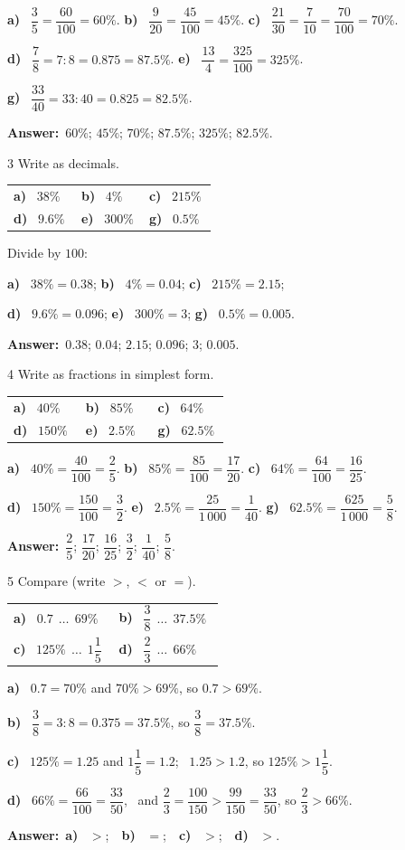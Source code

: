 \documentclass[11pt]{article}
\makeatletter
\newif\ifsol \solfalse
\renewcommand{\arraystretch}{1.35}
\providecommand{\AnsWord}{Đáp số}
\newcommand{\dapso}[1]{\par\textbf{\AnsWord:}\ #1}
\newcommand{\probsol}[1]{%
  \begin{lrbox}{\solmeasure}\begin{minipage}{\dimexpr\linewidth-24pt\relax}#1\end{minipage}\end{lrbox}%
  \ifsol
    \begin{solbox}#1\end{solbox}%
  \else
    \setlength{\solht}{\dimexpr\ht\solmeasure+\dp\solmeasure+0.85cm\relax}%
    \ifdim\solht<1.35cm\setlength{\solht}{1.35cm}\fi
    \begin{tcolorbox}[colback=white,colframe=Line,boxrule=0.8pt,arc=5pt,
      left=8pt,right=8pt,top=4pt,bottom=4pt,height=\solht]{\footnotesize\color{Slate}\itshape\WorkWord}\end{tcolorbox}%
  \fi}
\newcommand{\pa}[1]{\textbf{#1)}\ }
\newenvironment{cols2}{\par\vspace{3pt}\noindent\setlength{\tabcolsep}{0pt}\renewcommand{\arraystretch}{1.3}%
  \begin{tabular}{@{}>{\raggedright\arraybackslash\rule{0pt}{4.4ex}}p{0.48\linewidth}<{\rule[-2.3ex]{0pt}{0pt}}@{\hspace{0.03\linewidth}}>{\raggedright\arraybackslash\rule{0pt}{4.4ex}}p{0.48\linewidth}<{\rule[-2.3ex]{0pt}{0pt}}@{}}}%
  {\end{tabular}\par}
\newenvironment{cols3}{\par\vspace{3pt}\noindent\setlength{\tabcolsep}{0pt}\renewcommand{\arraystretch}{1.3}%
  \begin{tabular}{@{}>{\raggedright\arraybackslash\rule{0pt}{4.4ex}}p{0.32\linewidth}<{\rule[-2.3ex]{0pt}{0pt}}@{\hspace{0.015\linewidth}}>{\raggedright\arraybackslash\rule{0pt}{4.4ex}}p{0.32\linewidth}<{\rule[-2.3ex]{0pt}{0pt}}@{\hspace{0.015\linewidth}}>{\raggedright\arraybackslash\rule{0pt}{4.4ex}}p{0.32\linewidth}<{\rule[-2.3ex]{0pt}{0pt}}@{}}}%
  {\end{tabular}\par}
\newcommand{\gap}{\vspace{0.3cm}}
\def\WorkWord{Your work:}
\def\AnsWord{Answer}
\makeatother
\begin{document}
\probsol{
\pa{a} $\dfrac35=\dfrac{60}{100}=60\%$. \quad \pa{b} $\dfrac9{20}=\dfrac{45}{100}=45\%$. \quad \pa{c} $\dfrac{21}{30}=\dfrac7{10}=\dfrac{70}{100}=70\%$.\par
\pa{d} $\dfrac78=7:8=0.875=87.5\%$. \quad \pa{e} $\dfrac{13}4=\dfrac{325}{100}=325\%$.\par
\pa{g} $\dfrac{33}{40}=33:40=0.825=82.5\%$.
\dapso{$60\%$; $45\%$; $70\%$; $87.5\%$; $325\%$; $82.5\%$.}}
\gap
\begin{probbox}{3}{\relax}
Write as decimals.
\begin{cols3}
\pa{a} $38\%$ & \pa{b} $4\%$ & \pa{c} $215\%$\\
\pa{d} $9.6\%$ & \pa{e} $300\%$ & \pa{g} $0.5\%$
\end{cols3}
\end{probbox}
\probsol{
Divide by $100$:\par
\pa{a} $38\%=0.38$; \quad \pa{b} $4\%=0.04$; \quad \pa{c} $215\%=2.15$;\par
\pa{d} $9.6\%=0.096$; \quad \pa{e} $300\%=3$; \quad \pa{g} $0.5\%=0.005$.
\dapso{$0.38$; $0.04$; $2.15$; $0.096$; $3$; $0.005$.}}
\gap
\begin{probbox}{4}{\relax}
Write as fractions in simplest form.
\begin{cols3}
\pa{a} $40\%$ & \pa{b} $85\%$ & \pa{c} $64\%$\\
\pa{d} $150\%$ & \pa{e} $2.5\%$ & \pa{g} $62.5\%$
\end{cols3}
\end{probbox}
\probsol{
\pa{a} $40\%=\dfrac{40}{100}=\dfrac25$. \quad \pa{b} $85\%=\dfrac{85}{100}=\dfrac{17}{20}$. \quad \pa{c} $64\%=\dfrac{64}{100}=\dfrac{16}{25}$.\par
\pa{d} $150\%=\dfrac{150}{100}=\dfrac32$. \quad \pa{e} $2.5\%=\dfrac{25}{1\,000}=\dfrac1{40}$. \quad \pa{g} $62.5\%=\dfrac{625}{1\,000}=\dfrac58$.
\dapso{$\dfrac25$; $\dfrac{17}{20}$; $\dfrac{16}{25}$; $\dfrac32$; $\dfrac1{40}$; $\dfrac58$.}}
\gap
\begin{probbox}{5}{\relax}
Compare (write $>$, $<$ or $=$).
\begin{cols2}
\pa{a} $0.7\ \ \dots\ \ 69\%$ & \pa{b} $\dfrac38\ \ \dots\ \ 37.5\%$\\
\pa{c} $125\%\ \ \dots\ \ 1\dfrac15$ & \pa{d} $\dfrac23\ \ \dots\ \ 66\%$
\end{cols2}
\end{probbox}
\probsol{
\pa{a} $0.7=70\%$ and $70\%>69\%$, so $0.7>69\%$.\par
\pa{b} $\dfrac38=3:8=0.375=37.5\%$, so $\dfrac38=37.5\%$.\par
\pa{c} $125\%=1.25$ and $1\dfrac15=1.2$; \ $1.25>1.2$, so $125\%>1\dfrac15$.\par
\pa{d} $66\%=\dfrac{66}{100}=\dfrac{33}{50}$, \ and $\dfrac23=\dfrac{100}{150}>\dfrac{99}{150}=\dfrac{33}{50}$, so $\dfrac23>66\%$.
\dapso{\pa{a} $>$;\ \ \pa{b} $=$;\ \ \pa{c} $>$;\ \ \pa{d} $>$.}}
\end{document}
